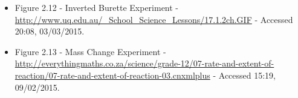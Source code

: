 \begin{itemize}
\item Figure 2.12 - Inverted Burette Experiment - \url{http://www.uq.edu.au/_School_Science_Lessons/17.1.2ch.GIF} - Accessed 20:08, 03/03/2015.

\item Figure 2.13 - Mass Change Experiment - \url{http://everythingmaths.co.za/science/grade-12/07-rate-and-extent-of-reaction/07-rate-and-extent-of-reaction-03.cnxmlplus} - Accessed 15:19, 09/02/2015.













\end{itemize}